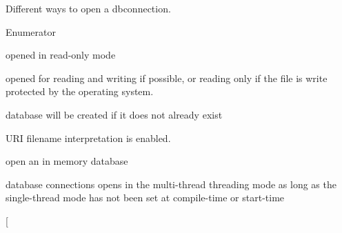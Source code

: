 Different ways to open a dbconnection. 

\begin{Desc}
\item[Enumerator]\par
\begin{description}
\item[{\em 
\hypertarget{a00038_ac886eded97b0430b2ab92e2d08fcf938abefe72871b2de8f4f0e20108517e31fe}{read\-\_\-only}\label{a00038_ac886eded97b0430b2ab92e2d08fcf938abefe72871b2de8f4f0e20108517e31fe}
}]opened in read-\/only mode \item[{\em 
\hypertarget{a00038_ac886eded97b0430b2ab92e2d08fcf938a06ad287ea83b37a6f9db3d8d10d72c8f}{read\-\_\-write}\label{a00038_ac886eded97b0430b2ab92e2d08fcf938a06ad287ea83b37a6f9db3d8d10d72c8f}
}]opened for reading and writing if possible, or reading only if the file is write protected by the operating system. \item[{\em 
\hypertarget{a00038_ac886eded97b0430b2ab92e2d08fcf938a76ea0bebb3c22822b4f0dd9c9fd021c5}{create}\label{a00038_ac886eded97b0430b2ab92e2d08fcf938a76ea0bebb3c22822b4f0dd9c9fd021c5}
}]database will be created if it does not already exist \item[{\em 
\hypertarget{a00038_ac886eded97b0430b2ab92e2d08fcf938a9305b73d359bd06734fee0b3638079e1}{uri}\label{a00038_ac886eded97b0430b2ab92e2d08fcf938a9305b73d359bd06734fee0b3638079e1}
}]U\-R\-I filename interpretation is enabled. \item[{\em 
\hypertarget{a00038_ac886eded97b0430b2ab92e2d08fcf938acd69b4957f06cd818d7bf3d61980e291}{memory}\label{a00038_ac886eded97b0430b2ab92e2d08fcf938acd69b4957f06cd818d7bf3d61980e291}
}]open an in memory database \item[{\em 
\hypertarget{a00038_ac886eded97b0430b2ab92e2d08fcf938afb79f3efe5bfb497a2fdd85aca8a73bb}{no\-\_\-mutex}\label{a00038_ac886eded97b0430b2ab92e2d08fcf938afb79f3efe5bfb497a2fdd85aca8a73bb}
}]database connections opens in the multi-\/thread threading mode as long as the single-\/thread mode has not been set at compile-\/time or start-\/time \item[{\em 
}
\end{description}
\end{Desc}
